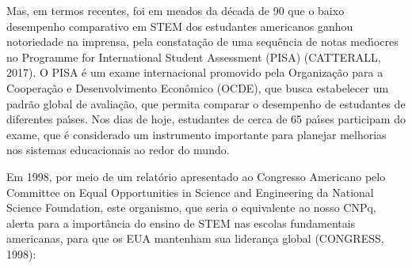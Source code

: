 \documentclass[
12pt,		%
openright,	%
twoside,  %
a4paper,			%
chapter=TITLE,		%
english,			%
french,				%
spanish,			%
brazil				%
]{USPSC-classe/USPSC}
\begin{document}
\noindent\begin{center}\mbox{\centering{}}\end{center}


Mas, em termos recentes, foi em meados da d\'ecada de 90 que o baixo desempenho comparativo em STEM dos estudantes americanos ganhou notoriedade na imprensa, pela constata\c{c}\~ao de uma sequ\^encia de notas med\'{\i}ocres no Programme for International Student Assessment (PISA)  (CATTERALL, 2017). O PISA \'e um exame internacional promovido pela Organiza\c{c}\~ao para a Coopera\c{c}\~ao e Desenvolvimento Econ\^omico (OCDE), que busca estabelecer um padr\~ao global de avalia\c{c}\~ao, que permita comparar o desempenho de estudantes de diferentes pa\'{\i}ses. Nos dias de hoje, estudantes de cerca de 65 pa\'{\i}ses participam do exame, que \'e considerado um instrumento importante para planejar melhorias nos sistemas educacionais ao redor do mundo.









Em 1998, por meio de um relat\'orio apresentado ao Congresso Americano pelo Committee on Equal Opportunities in Science and Engineering da National Science Foundation, este organismo, que seria o equivalente ao nosso CNPq, alerta para a import\^ancia do ensino de STEM nas escolas fundamentais americanas, para que os EUA mantenham sua lideran\c{c}a global  (CONGRESS, 1998):










\noindent\begin{center}\mbox{\centering{}}\end{center}
\end{document}
